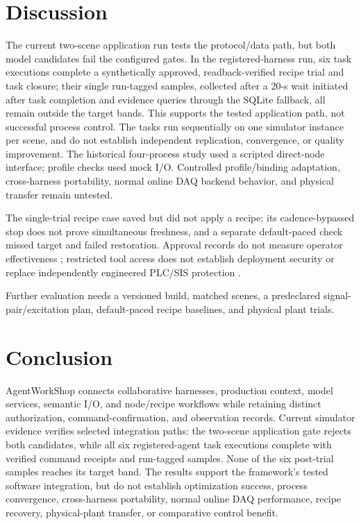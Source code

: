\section{Discussion}
\label{sec:limits}
The current two-scene application run tests the protocol/data path, but both
model candidates fail the configured gates. In the registered-harness run,
six task executions complete a
synthetically approved, readback-verified recipe trial and task closure;
their single run-tagged samples, collected after a 20-s wait initiated after
task completion and evidence queries through the SQLite fallback, all remain
outside the target bands. This supports the tested
application path, not successful process control. The tasks run sequentially
on one simulator instance per scene, and do not establish independent
replication, convergence, or quality improvement. The historical four-process
study used a scripted direct-node interface; profile checks used mock I/O. Controlled
profile/binding adaptation, cross-harness portability, normal online DAQ
backend behavior, and physical transfer remain untested.

The single-trial recipe case saved but did not apply a recipe; its cadence-bypassed stop does not prove
simultaneous freshness, and a separate default-paced check missed target and
failed restoration. Approval records do not measure operator effectiveness
\cite{parasuramanmanzey2010complacency,parasuraman2000model,bainbridge1983ironies};
restricted tool access does not establish deployment security
\cite{greshake2023injection,liu2024pinjection,iec62443-3-3} or replace
independently engineered PLC/SIS protection \cite{iec61511}.

Further evaluation needs a versioned build, matched scenes, a predeclared
signal-pair/excitation plan, default-paced recipe baselines, and physical
plant trials.

\section{Conclusion}
\label{sec:conclusion}
AgentWorkShop connects collaborative harnesses, production context, model
services, semantic I/O, and node/recipe workflows while retaining distinct
authorization, command-confirmation, and observation records. Current
simulator evidence verifies selected integration paths: the two-scene
application gate rejects both candidates, while all six registered-agent task
executions
complete with verified command receipts and run-tagged samples. None of the
six post-trial samples reaches its target band. The results support the
framework's tested software integration, but do not establish optimization
success, process convergence, cross-harness portability, normal online DAQ
performance, recipe recovery, physical-plant transfer, or comparative control
benefit.
